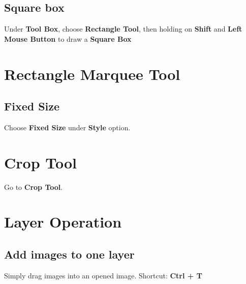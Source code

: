 \documentclass[10pt,a4paper]{article}
\begin{document}
\subsection{Square box}
Under \textbf{Tool Box}, choose \textbf{Rectangle Tool}, then holding on \textbf{Shift} and \textbf{Left Mouse Button} to draw a \textbf{Square Box}

\section{Rectangle Marquee Tool}
\subsection{Fixed Size}
Choose \textbf{Fixed Size} under \textbf{Style} option.

\section{Crop Tool}
Go to \textbf{Crop Tool}.

\section{Layer Operation}
\subsection{Add images to one layer}
Simply drag images into an opened image.
Shortcut: \textbf{Ctrl + T}



\end{document}
